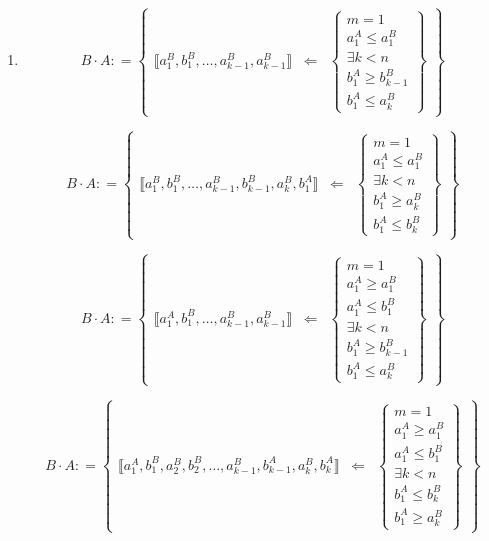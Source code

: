 \begin{enumerate}
\def\labelenumi{\arabic{enumi}.}
\setcounter{enumi}{5}
\item
  \[{{B \cdot A}{: =}}\begin{Bmatrix}
  {⟦{{a_{1}^{B},b_{1}^{B}},\ldots,{a_{k - 1}^{B},a_{k - 1}^{B}}}⟧} & {\Leftarrow} & \begin{Bmatrix}
  {m = 1} \\
  {a_{1}^{A} \leq a_{1}^{B}} \\
  {\exists{k < n}} \\
  {b_{1}^{A} \geq b_{k - 1}^{B}} \\
  {b_{1}^{A} \leq a_{k}^{B}}
  \end{Bmatrix}
  \end{Bmatrix}\]

  \[{{B \cdot A}{: =}}\begin{Bmatrix}
  {⟦{{a_{1}^{B},b_{1}^{B}},\ldots,{a_{k - 1}^{B},b_{k - 1}^{B}},{a_{k}^{B},b_{1}^{A}}}⟧} & {\Leftarrow} & \begin{Bmatrix}
  {m = 1} \\
  {a_{1}^{A} \leq a_{1}^{B}} \\
  {\exists{k < n}} \\
  {b_{1}^{A} \geq a_{k}^{B}} \\
  {b_{1}^{A} \leq b_{k}^{B}}
  \end{Bmatrix}
  \end{Bmatrix}\]

  \[{{B \cdot A}{: =}}\begin{Bmatrix}
  {⟦{{a_{1}^{A},b_{1}^{B}},\ldots,{a_{k - 1}^{B},a_{k - 1}^{B}}}⟧} & {\Leftarrow} & \begin{Bmatrix}
  {m = 1} \\
  {a_{1}^{A} \geq a_{1}^{B}} \\
  {a_{1}^{A} \leq b_{1}^{B}} \\
  {\exists{k < n}} \\
  {b_{1}^{A} \geq b_{k - 1}^{B}} \\
  {b_{1}^{A} \leq a_{k}^{B}}
  \end{Bmatrix}
  \end{Bmatrix}\]

  \[{{B \cdot A}{: =}}\begin{Bmatrix}
  {⟦{{a_{1}^{A},b_{1}^{B}},{a_{2}^{B},b_{2}^{B}},\ldots,{a_{k - 1}^{B},b_{k - 1}^{A}},{a_{k}^{B},b_{k}^{A}}}⟧} & \Leftarrow & \begin{Bmatrix}
  {m = 1} \\
  {a_{1}^{A} \geq a_{1}^{B}} \\
  {a_{1}^{A} \leq b_{1}^{B}} \\
  {\exists{k < n}} \\
  {b_{1}^{A} \leq b_{k}^{B}} \\
  {b_{1}^{A} \geq a_{k}^{B}}
  \end{Bmatrix}
  \end{Bmatrix}\]


\end{enumerate}
